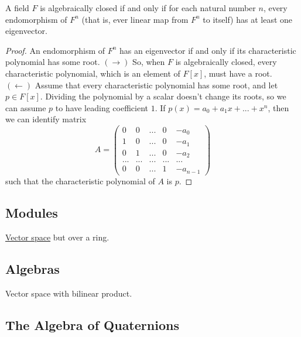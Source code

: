   \begin{theorem}
    \label{thm:eigenvector-conditions-for-algebraic-closedness}
    A field $F$ is algebraically closed if and only if for each natural number $n$, every endomorphism of $F^n$ (that is, ever linear map from $F^n$ to itself) has at least one eigenvector. 
  \end{theorem}
  \begin{proof}
    An endomorphism of $F^n$ has an eigenvector if and only if its characteristic polynomial has some root. $(\rightarrow)$ So, when $F$ is algebraically closed, every characteristic polynomial, which is an element of $F[x]$, must have a root. $(\leftarrow)$ Assume that every characteristic polynomial has some root, and let $p \in F[x]$. Dividing the polynomial by a scalar doesn't change its roots, so we can assume $p$ to have leading coefficient $1$. If $p(x) = a_0 + a_1 x + ... + x^n$, then we can identify matrix 
    \begin{equation}
      A = \begin{pmatrix}
      0 & 0 & ... & 0 & -a_0 \\
      1 & 0 & ... & 0 & -a_1 \\
      0 & 1 & ... & 0 & -a_2 \\
      ... & ... & ... & ... & ... \\
      0 & 0 & ... & 1 & -a_{n-1}
      \end{pmatrix}
    \end{equation}
    such that the characteristic polynomial of $A$ is $p$. 
  \end{proof}


\subsection{Modules}

  \hyperref[def:vector-space]{Vector space} but over a ring. 

\subsection{Algebras}

  Vector space with bilinear product.  

\subsection{The Algebra of Quaternions}

